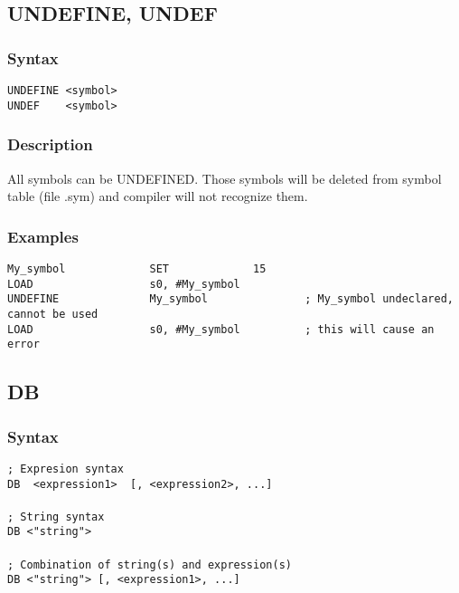     \subsection{UNDEFINE, UNDEF}
        \subsubsection{Syntax}
            \verb'UNDEFINE <symbol>'\\
            \verb'UNDEF    <symbol>'

        \subsubsection{Description}
            All symbols can be UNDEFINED. Those symbols will be deleted from symbol table (file .sym) and compiler will not recognize them.

        \subsubsection{Examples}
            \verb'My_symbol             SET             15'\\
            \verb'LOAD                  s0, #My_symbol'\\
            \verb'UNDEFINE              My_symbol               ; My_symbol undeclared, cannot be used'\\
            \verb'LOAD                  s0, #My_symbol          ; this will cause an error'

    \subsection{DB}
        \subsubsection{Syntax}
            \verb'; Expresion syntax'\\
            \verb'DB  <expression1>  [, <expression2>, ...]'\\
            \verb''\\
            \verb'; String syntax'\\
            \verb'DB <"string">'\\
            \verb''\\
            \verb'; Combination of string(s) and expression(s)'\\
            \verb'DB <"string"> [, <expression1>, ...]'


